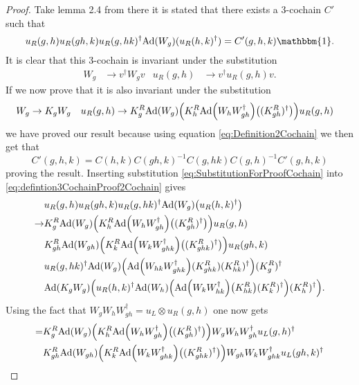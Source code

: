 \documentclass[12pt,a4paper,twoside]{article}
\let\originalleft\left
\let\originalright\right
\renewcommand{\left}{\mathopen{}\mathclose\bgroup\originalleft}
\renewcommand{\right}{\aftergroup\egroup\originalright}
\newcommand{\Ad}[1]{\textrm{Ad}\left(#1\right)}
\theoremstyle{definition}
\numberwithin{equation}{section}
\begin{document}
\begin{proof}
	Take lemma 2.4 from \cite{ogata2021h3gmathbb} there it is stated that there exists a 3-cochain $C'$ such that
	\begin{equation}\label{eq:defintion3CochainProof2Cochain}
		u_R(g,h)u_R(gh,k)u_R(g,hk)^\dagger\Ad{W_g}(u_R(h,k)^\dagger)=C'(g,h,k)\mathbbm{1}.
	\end{equation}
	It is clear that this 3-cochain is invariant under the substitution
	\begin{align}
		W_g&\rightarrow v^\dagger W_g v&u_R(g,h)&\rightarrow v^\dagger u_R(g,h)v.
	\end{align}
	If we now prove that it is also invariant under the substitution
	\begin{align}\label{eq:SubstitutionForProofCochain}
		W_g&\rightarrow K_g W_g&u_R(g,h)&\rightarrow K_g^R\Ad{W_g}\left(K_h^R\Ad{W_hW_{gh}^\dagger}\left((K_{gh}^R)^\dagger\right)\right)u_
		R(g,h)
	\end{align}
	we have proved our result because using equation \eqref{eq:Definition2Cochain} we then get that
	\begin{equation}
		C'(g,h,k)=C(h,k)C(gh,k)^{-1}C(g,hk)C(g,h)^{-1}C'(g,h,k)
	\end{equation}
	proving the result. Inserting substitution \eqref{eq:SubstitutionForProofCochain} into \eqref{eq:defintion3CochainProof2Cochain} gives
	\begin{align}
		&u_R(g,h)u_R(gh,k)u_R(g,hk)^\dagger\Ad{W_g}\left(u_R(h,k)^\dagger\right)\\
		\rightarrow&K_g^R\Ad{W_g}\left(K_h^R\Ad{W_hW_{gh}^\dagger}\left((K_{gh}^R)^\dagger\right)\right)u_
		R(g,h)\\
		&K_{gh}^R\Ad{W_{gh}}\left(K_k^R\Ad{W_kW_{ghk}^\dagger}\left((K_{ghk}^R)^\dagger\right)\right)u_
		R(gh,k)\\
		&u_R(g,hk)^\dagger \Ad{W_g}\left( \Ad{W_{hk}W_{ghk}^\dagger}(K^R_{ghk})(K^R_{hk})^{\dagger} \right)(K^R_g)^\dagger\\
		&\Ad{K_gW_g}\left(u_R(h,k)^\dagger \Ad{W_h}\left(\Ad{W_kW_{hk}^\dagger}\left(K_{hk}^R\right)(K^R_k)^\dagger\right)(K^R_h)^\dagger\right).
	\end{align}
	Using the fact that $W_gW_hW_{gh}^\dagger=u_L\otimes u_R(g,h)$ one now gets
	\begin{align}
		=&K_g^R\Ad{W_g}\left(K_h^R\Ad{W_hW_{gh}^\dagger}\left((K_{gh}^R)^\dagger\right)\right)W_gW_hW_{gh}^\dagger u_L(g,h)^\dagger\\
		\nonumber
		&K_{gh}^R\Ad{W_{gh}}\left(K_k^R\Ad{W_kW_{ghk}^\dagger}\left((K_{ghk}^R)^\dagger\right)\right) W_{gh}W_kW_{ghk}^\dagger u_L(gh,k)^\dagger\\

\end{align}
\end{proof}
\end{document}
